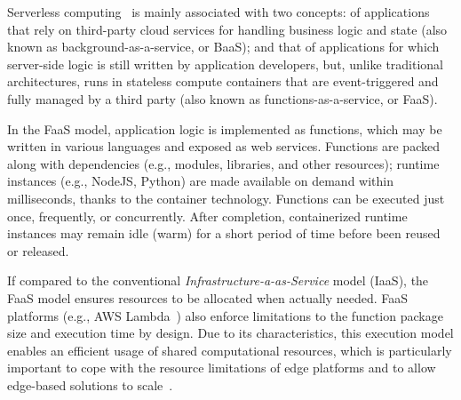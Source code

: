 Serverless computing~\cite{Lloyd18serverless,Roberts:2018} is mainly associated with two concepts: of applications that rely on third-party cloud services for handling business logic and state (also known as background-as-a-service, or BaaS); and that of applications for which server-side logic is still written by application developers, but, unlike traditional architectures, runs in stateless compute containers that are event-triggered
and fully managed by a third party (also known as functions-as-a-service, or FaaS).

In the FaaS model, application logic is implemented as functions, which may be written in various languages and exposed as web services. Functions are packed along with dependencies (e.g., modules, libraries, and other resources); runtime instances (e.g., NodeJS, Python) are made available on demand within milliseconds, thanks to the container technology. Functions can be executed just once, frequently, or concurrently. After completion, containerized runtime instances may remain idle (warm) for a short period of time before been reused or released.

If compared to the conventional \textit{Infrastructure-a-as-Service} model (IaaS), the FaaS model ensures resources to be allocated when actually needed. FaaS platforms (e.g., AWS Lambda~\cite{AWSLambda}) also enforce limitations to the function package size and execution time by design. Due to its characteristics, this execution model enables an efficient usage of shared computational resources, which is particularly important to cope with the resource limitations of edge platforms and to allow edge-based solutions to scale~\cite{GarrigaMendonca2017}.





%



